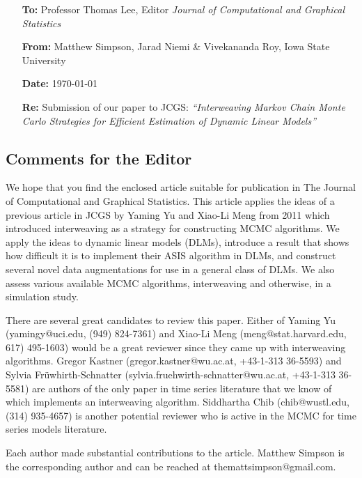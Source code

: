 \documentclass[11pt]{article}
\begin{document}
\begin{itemize}
\item[\bf To:]  Professor Thomas Lee,  Editor\newline
{\em Journal of Computational and Graphical Statistics}
\item[\bf From:] Matthew Simpson, Jarad Niemi \& Vivekananda Roy, Iowa State University
\item[\bf Date:] \today
\item[\bf Re:] Submission of our paper to JCGS:
{\em ``Interweaving Markov Chain Monte Carlo Strategies for Efficient
    Estimation of Dynamic Linear Models''}
\end{itemize}

\subsection*{Comments for the Editor}

We hope that you find the enclosed article suitable for publication in The Journal of Computational and Graphical Statistics. This article applies the ideas of a previous article in JCGS by Yaming Yu and Xiao-Li Meng from 2011 which introduced interweaving as a strategy for constructing MCMC algorithms. We apply the ideas to dynamic linear models (DLMs), introduce a result that shows how difficult it is to implement their ASIS algorithm in DLMs, and construct several novel data augmentations for use in a general class of DLMs. We also assess various available MCMC algorithms, interweaving and otherwise, in a simulation study.

There are several great candidates to review this paper. Either of Yaming Yu (yamingy@uci.edu, (949) 824-7361) and Xiao-Li Meng (meng@stat.harvard.edu, 617) 495-1603) would be a great reviewer since they came up with interweaving algorithms. Gregor Kastner (gregor.kastner@wu.ac.at, +43-1-313 36-5593) and Sylvia Fr{\"u}whirth-Schnatter (sylvia.fruehwirth-schnatter@wu.ac.at, +43-1-313 36-5581) are authors of the only paper in time series literature that we know of which implements an interweaving algorithm. Siddhartha Chib (chib@wustl.edu, (314) 935-4657) is another potential reviewer who is active in the MCMC for time series models literature.

Each author made substantial contributions to the article. Matthew Simpson is the corresponding author and can be reached at themattsimpson@gmail.com.
\end{document}
